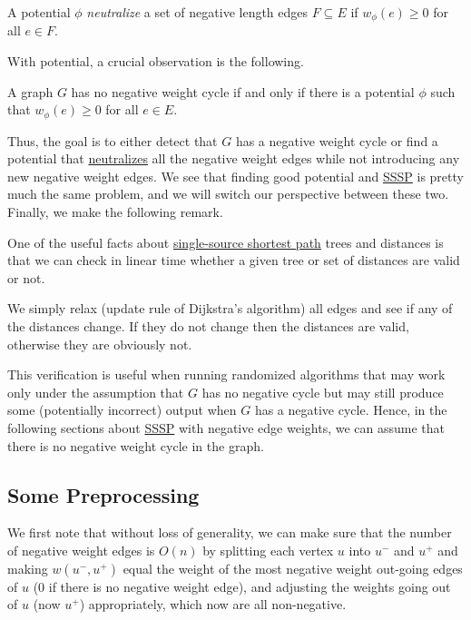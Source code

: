\begin{definition}[Neutralize]\label{def:neutralize}
	A potential \(\phi \) \emph{neutralize} a set of negative length edges \(F \subseteq E\) if \(w_{\phi } (e) \geq 0\) for all \(e \in F\).
\end{definition}

With potential, a crucial observation is the following.

\begin{lemma}\label{lma:negative-cycle}
	A graph \(G\) has no negative weight cycle if and only if there is a potential \(\phi \) such that \(w_{\phi } (e) \geq 0\) for all \(e \in E\).
\end{lemma}

Thus, the goal is to either detect that \(G\) has a negative weight cycle or find a potential that \hyperref[def:neutralize]{neutralizes} all the negative weight edges while not introducing any new negative weight edges. We see that finding good potential and \hyperref[prb:SSSP]{SSSP} is pretty much the same problem, and we will switch our perspective between these two. Finally, we make the following remark.

\begin{claim}[Verification]\label{clm:SSSP-verfication}
	One of the useful facts about \hyperref[prb:SSSP]{single-source shortest path} trees and distances is that we can check in linear time whether a given tree or set of distances are valid or not.
\end{claim}
\begin{explanation}
	We simply relax (update rule of Dijkstra's algorithm) all edges and see if any of the distances change. If they do not change then the distances are valid, otherwise they are obviously not.
\end{explanation}

This verification is useful when running randomized algorithms that may work only under the assumption that \(G\) has no negative cycle but may still produce some (potentially incorrect) output when \(G\) has a negative cycle. Hence, in the following sections about \hyperref[prb:SSSP]{SSSP} with negative edge weights, we can assume that there is no negative weight cycle in the graph.



\subsection{Some Preprocessing}
We first note that without loss of generality, we can make sure that the number of negative weight edges is \(O(n)\) by splitting each vertex \(u\) into \(u^-\) and \(u^+\) and making \(w(u^-, u^+)\) equal the weight of the most negative weight out-going edges of \(u\) (\(0\) if there is no negative weight edge), and adjusting the weights going out of \(u\) (now \(u^+\)) appropriately, which now are all non-negative.

